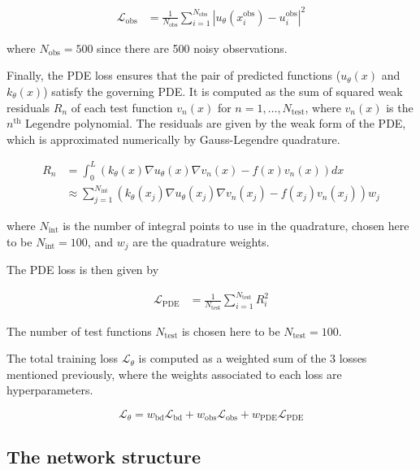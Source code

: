 \begin{align}
	\mathcal{L}_\mathrm{obs} &= \frac{1}{N_\mathrm{obs}} \sum_{i=1}^{N_\mathrm{obs}} \left| u_\theta (x_i^\mathrm{obs}) - u_i^\mathrm{obs} \right|^2
\end{align}

\noindent
where $N_\mathrm{obs} = 500$ since there are 500 noisy observations.

Finally, the PDE loss ensures that the pair of predicted functions ($u_\theta (x)$ and $k_\theta (x)$) satisfy the governing PDE. It is computed as the sum of squared weak residuals $R_n$ of each test function $v_n(x)$ for $n = 1, \dots, N_\mathrm{test}$, where $v_n(x)$ is the $n^\text{th}$ Legendre polynomial. The residuals are given by the weak form of the PDE, which is approximated numerically by Gauss-Legendre quadrature.

\begin{align}
	R_n &= \int_{0}^{L} \left( k_\theta(x) \nabla u_\theta(x) \nabla v_n(x) - f(x) v_n(x) \right) dx \\
	&\approx \sum_{j=1}^{N_\mathrm{int}} \left( k_\theta (x_j) \nabla u_\theta(x_j) \nabla v_n(x_j) - f(x_j) v_n(x_j) \right) w_j
\end{align}

\noindent
where $N_\mathrm{int}$ is the number of integral points to use in the quadrature, chosen here to be $N_\mathrm{int} = 100$, and $w_j$ are the quadrature weights.

The PDE loss is then given by

\begin{align}
	\mathcal{L}_\mathrm{PDE} &= \frac{1}{N_\mathrm{test}} \sum_{i=1}^{N_\mathrm{test}} R_i^2
\end{align}

\noindent
The number of test functions $N_\mathrm{test}$ is chosen here to be $N_\mathrm{test} = 100$.

The total training loss $\mathcal{L}_\theta$ is computed as a weighted sum of the 3 losses mentioned previously, where the weights associated to each loss are hyperparameters.

\begin{equation}
	\mathcal{L}_\theta = w_\mathrm{bd} \mathcal{L}_\mathrm{bd} + w_\mathrm{obs} \mathcal{L}_\mathrm{obs} + w_\mathrm{PDE} \mathcal{L}_\mathrm{PDE}
\end{equation}





%
\subsection{The network structure}
%

